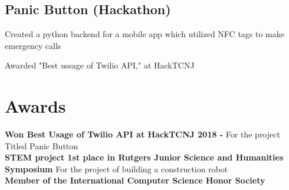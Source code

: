 \documentclass{resume}
\begin{document}
\subsection{Panic Button (Hackathon)}
\begin{tightemize}
\item Created a python backend for a mobile app which utilized NFC tags to make emergency calls
\item Awarded "Best ussage of Twilio API," at HackTCNJ
\end{tightemize}

\section{Awards}
\textbf{Won Best Usage of Twilio API at HackTCNJ 2018 -}\hspace{1mm} For the project Titled Panic Button\\
\textbf{STEM project 1st place in Rutgers Junior Science and Humanities Symposium}\hspace{1mm} For the project of building a construction robot\\
\textbf{Member of the International Computer Science Honor Society}\\
\end{document}
